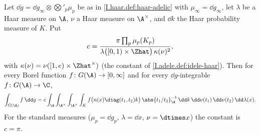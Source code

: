 Let $\dd g=\dd g_\infty\otimes\bigotimes'_p\mu_p$ be as in \cref{I.haar.def:haar-adelic} with $\mu_\infty=\dd g_\infty$,
let $\lambda$ be a Haar measure on $\A$, $\nu$ a Haar measure on $\A^\times$, and $\dd k$ the Haar probability measure
of $K$. Put
\[
  c=\frac{\pi\prod_p\mu_p(K_p)}{\lambda\bigl([0,1)\times\Zhat\bigr)\,\kappa(\nu)^2},
\]
with $\kappa(\nu)=\nu([1,e)\times\Zhat^\times)$ (the constant of \cref{I.adele.def:idele-haar}). Then for every Borel
function $f\colon G(\A)\to[0,\infty]$ and for every $\dd g$-integrable $f\colon G(\A)\to\C$,
\[
  \int_{G(\A)}f\,\dd g=c\int_\A\int_{\A^\times}\int_{\A^\times}\int_K
  f\bigl(n(x)\diag(t_1,t_2)k\bigr)\,\abs{t_1/t_2}_\A^{-1}\,\dd k\,\dd\nu(t_1)\,\dd\nu(t_2)\,\dd\lambda(x).
\]
For the standard measures ($\mu_p=\dd g_p$, $\lambda=\dd x$, $\nu=\dtimes x$) the constant is $c=\pi$.
